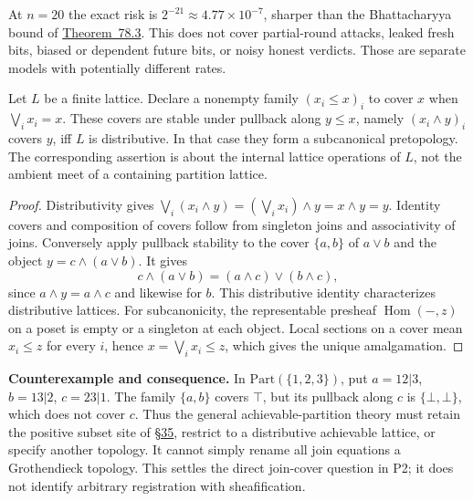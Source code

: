 At \(n=20\) the exact risk is \(2^{-21}\approx4.77\times10^{-7}\), sharper than the Bhattacharyya bound of \hyperlink{stmt:78.3}{Theorem~78.3}. This does not cover partial-round attacks, leaked fresh bits, biased or dependent future bits, or noisy honest verdicts. Those are separate models with potentially different rates.


\begin{thmplain}

Let \(L\) be a finite lattice. Declare a nonempty family \((x_i\le x)_i\) to cover \(x\) when \(\bigvee_i x_i=x\). These covers are stable under pullback along \(y\le x\), namely \((x_i\wedge y)_i\) covers \(y\), iff \(L\) is distributive. In that case they form a subcanonical pretopology. The corresponding assertion is about the internal lattice operations of \(L\), not the ambient meet of a containing partition lattice.
\end{thmplain}

\begin{proof}

Distributivity gives \(\bigvee_i(x_i\wedge y)=(\bigvee_i x_i)\wedge y=x\wedge y=y\). Identity covers and composition of covers follow from singleton joins and associativity of joins. Conversely apply pullback stability to the cover \(\{a,b\}\) of \(a\vee b\) and the object \(y=c\wedge(a\vee b)\). It gives
\[
c\wedge(a\vee b)=(a\wedge c)\vee(b\wedge c),
\]
since \(a\wedge y=a\wedge c\) and likewise for \(b\). This distributive identity characterizes distributive lattices. For subcanonicity, the representable presheaf \(\operatorname{Hom}(-,z)\) on a poset is empty or a singleton at each object. Local sections on a cover mean \(x_i\le z\) for every \(i\), hence \(x=\bigvee_i x_i\le z\), which gives the unique amalgamation.
\end{proof}

\textbf{Counterexample and consequence.} In \(\mathrm{Part}(\{1,2,3\})\), put \(a=12|3\), \(b=13|2\), \(c=23|1\). The family \(\{a,b\}\) covers \(\top\), but its pullback along \(c\) is \(\{\bot,\bot\}\), which does not cover \(c\). Thus the general achievable-partition theory must retain the positive subset site of \hyperlink{sec:35}{§35}, restrict to a distributive achievable lattice, or specify another topology. It cannot simply rename all join equations a Grothendieck topology. This settles the direct join-cover question in P2; it does not identify arbitrary registration with sheafification.

